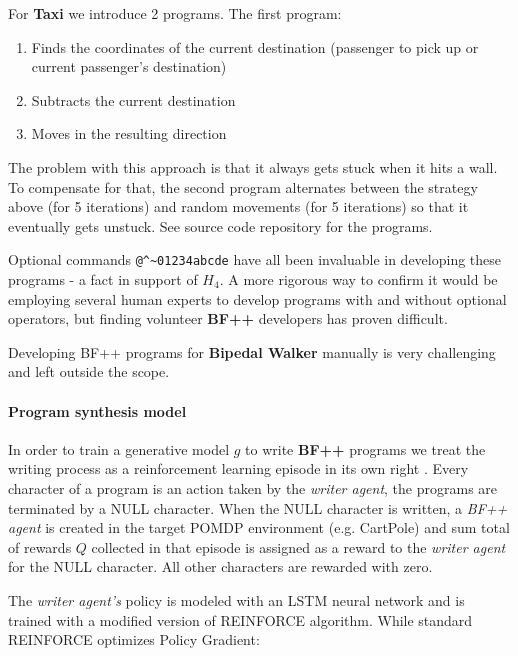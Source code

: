 For \textbf{Taxi} we introduce 2 programs.
The first program:
\begin{enumerate}
    \item Finds the coordinates of the current destination (passenger to pick up or current passenger's destination)
    \item Subtracts the current destination 
    \item Moves in the resulting direction
\end{enumerate}

The problem with this approach is that it always gets stuck when it hits a wall.
To compensate for that, the second program alternates between the strategy above (for 5 iterations) and random movements (for 5 iterations) so that it eventually gets unstuck. See source code repository for the programs.

Optional commands \verb|@^~01234abcde| have all been invaluable in developing these programs - a fact in support of $H_4$.
A more rigorous way to confirm it would be employing several human experts to develop programs with and without optional operators, but finding volunteer \textbf{BF++} developers has proven difficult. 

Developing BF++ programs for \textbf{Bipedal Walker} manually is very challenging and left outside the scope.

\paragraph{Program synthesis model}

In order to train a generative model $g$ to write \textbf{BF++} programs we treat the writing process as a reinforcement learning episode in its own right \cite{abolafiaNeuralProgramSynthesis2018} .
Every character of a program is an action taken by the \emph{writer agent}, the programs are terminated by a NULL character.
When the NULL character is written, a \emph{BF++ agent} is created in the target POMDP environment (e.g. CartPole) and sum total of rewards $Q$ collected in that episode is assigned as a reward to the \emph{writer agent} for the NULL character.
All other characters are rewarded with zero.

The \emph{writer agent's} policy is modeled with an LSTM \cite{hochreiterLongShorttermMemory1997} neural network and is trained with a modified version of REINFORCE \cite{williamsSimpleStatisticalGradientfollowing1992}algorithm.
While standard REINFORCE optimizes Policy Gradient:

